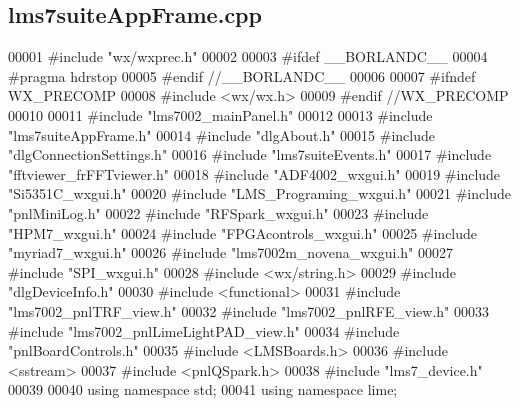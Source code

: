 \subsection{lms7suite\+App\+Frame.\+cpp}
\label{lms7suiteAppFrame_8cpp_source}

\begin{DoxyCode}
00001 \textcolor{preprocessor}{#include "wx/wxprec.h"}
00002 
00003 \textcolor{preprocessor}{#ifdef \_\_BORLANDC\_\_}
00004 \textcolor{preprocessor}{#pragma hdrstop}
00005 \textcolor{preprocessor}{#endif //\_\_BORLANDC\_\_}
00006 
00007 \textcolor{preprocessor}{#ifndef WX\_PRECOMP}
00008 \textcolor{preprocessor}{#include <wx/wx.h>}
00009 \textcolor{preprocessor}{#endif //WX\_PRECOMP}
00010 
00011 \textcolor{preprocessor}{#include "lms7002_mainPanel.h"}
00012 
00013 \textcolor{preprocessor}{#include "lms7suiteAppFrame.h"}
00014 \textcolor{preprocessor}{#include "dlgAbout.h"}
00015 \textcolor{preprocessor}{#include "dlgConnectionSettings.h"}
00016 \textcolor{preprocessor}{#include "lms7suiteEvents.h"}
00017 \textcolor{preprocessor}{#include "fftviewer_frFFTviewer.h"}
00018 \textcolor{preprocessor}{#include "ADF4002_wxgui.h"}
00019 \textcolor{preprocessor}{#include "Si5351C_wxgui.h"}
00020 \textcolor{preprocessor}{#include "LMS_Programing_wxgui.h"}
00021 \textcolor{preprocessor}{#include "pnlMiniLog.h"}
00022 \textcolor{preprocessor}{#include "RFSpark_wxgui.h"}
00023 \textcolor{preprocessor}{#include "HPM7_wxgui.h"}
00024 \textcolor{preprocessor}{#include "FPGAcontrols_wxgui.h"}
00025 \textcolor{preprocessor}{#include "myriad7_wxgui.h"}
00026 \textcolor{preprocessor}{#include "lms7002m_novena_wxgui.h"}
00027 \textcolor{preprocessor}{#include "SPI_wxgui.h"}
00028 \textcolor{preprocessor}{#include <wx/string.h>}
00029 \textcolor{preprocessor}{#include "dlgDeviceInfo.h"}
00030 \textcolor{preprocessor}{#include <functional>}
00031 \textcolor{preprocessor}{#include "lms7002_pnlTRF_view.h"}
00032 \textcolor{preprocessor}{#include "lms7002_pnlRFE_view.h"}
00033 \textcolor{preprocessor}{#include "lms7002_pnlLimeLightPAD_view.h"}
00034 \textcolor{preprocessor}{#include "pnlBoardControls.h"}
00035 \textcolor{preprocessor}{#include <LMSBoards.h>}
00036 \textcolor{preprocessor}{#include <sstream>}
00037 \textcolor{preprocessor}{#include <pnlQSpark.h>}
00038 \textcolor{preprocessor}{#include "lms7_device.h"}
00039 
00040 \textcolor{keyword}{using namespace }std;
00041 \textcolor{keyword}{using namespace }lime;

\end{DoxyCode}
